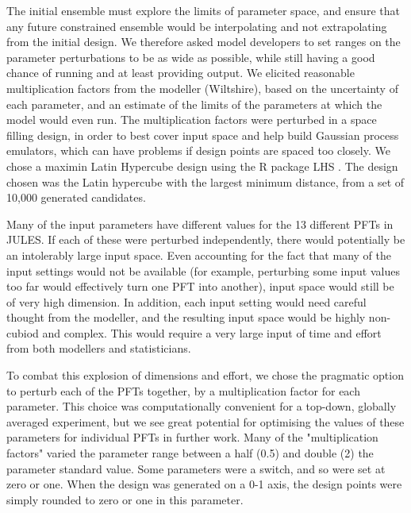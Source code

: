 \documentclass[gmd, manuscript]{copernicus}
\begin{document}
The initial ensemble must explore the limits of parameter space, and ensure that any future constrained ensemble would be interpolating and not extrapolating from the initial design. We therefore asked model developers to set ranges on the parameter perturbations to be as wide as possible, while still having a good chance of running and at least providing output. We elicited reasonable multiplication factors from the modeller (Wiltshire), based on the uncertainty of each parameter, and an estimate of the limits of the parameters at which the model would even run. The multiplication factors were perturbed in a space filling design, in order to best cover input space and help build Gaussian process emulators, which can have problems if design points are spaced too closely. We chose a maximin Latin Hypercube design using the R package LHS \citep{Rpackage2021lhs}. The design chosen was the Latin hypercube with the largest minimum distance, from a set of 10,000 generated candidates.

Many of the input parameters have different values for the 13 different PFTs in JULES. If each of these were perturbed independently, there would potentially be an intolerably large input space. Even accounting for the fact that many of the input settings would not be available (for example, perturbing some input values too far would effectively turn one PFT into another), input space would still be of very high dimension. In addition, each input setting would need careful thought from the modeller, and the resulting input space would be highly non-cubiod and complex. This would require a very large input of time and effort from both modellers and statisticians.

To combat this explosion of dimensions and effort, we chose the pragmatic option to perturb each of the PFTs together, by a multiplication factor for each parameter. This choice was computationally convenient for a top-down, globally averaged experiment, but we see great potential for optimising the values of these parameters for individual PFTs in further work. Many of the "multiplication factors" varied the parameter range between a half (0.5) and double (2) the parameter standard value. Some parameters were a switch, and so were set at zero or one. When the design was generated on a 0-1 axis, the design points were simply rounded to zero or one in this parameter.
\end{document}
